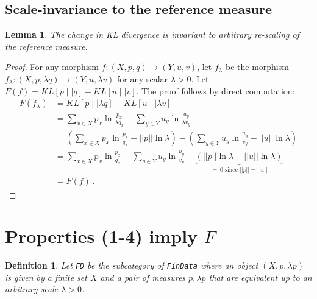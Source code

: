 \documentclass{article}
\newtheorem{definition}{Definition}
\newtheorem{lemma}{Lemma}
\begin{document}
{\subsection{Scale-invariance to the reference measure}
\begin{lemma}
    The change in KL divergence is invariant to arbitrary re-scaling of the reference measure.
\end{lemma}
\begin{proof}
For any morphism $f:(X, p, q) \rightarrow (Y, u, v)$, let $f_\lambda$ be the morphism $f_\lambda:(X, p, \lambda q) \rightarrow (Y, u, \lambda v)$ for any scalar $\lambda > 0$. Let $F(f) = KL[p \mid\mid q] - KL[u \mid\mid v]$. The proof follows by direct computation:
\begin{align*}
    F(f_\lambda) &= KL[p \mid\mid \lambda q] - KL[u \mid\mid \lambda v]\\
    &= \sum_{x\in X} p_x \ln \frac{p_x}{\lambda q_x} - \sum_{y\in Y} u_y \ln \frac{u_y}{\lambda v_y}\\
    &= \left(\sum_{x\in X} p_x \ln \frac{p_x}{q_x} - ||p||\ln\lambda\right) - \left(\sum_{y\in Y} u_y \ln \frac{u_y}{ v_y} - ||u||\ln\lambda\right)\\
    &= \sum_{x\in X} p_x \ln \frac{p_x}{q_x} - \sum_{y\in Y} u_y \ln \frac{u_y}{v_y} - \underbrace{\left(||p||\ln\lambda - ||u||\ln\lambda\right)}_{= \ 0 \text{ since } ||p|| = ||u||}\\
    &= F(f)\,.
\end{align*}
\end{proof}

\section{Properties (1-4) imply $F$}

\begin{definition}
    Let \texttt{FD} be the subcategory of \texttt{FinData} where an object $(X, p, \lambda p)$ is given by a finite set $X$ and a pair of measures $p, \lambda p$ that are equivalent up to an arbitrary scale $\lambda > 0$.
\end{definition}

}
\end{document}
